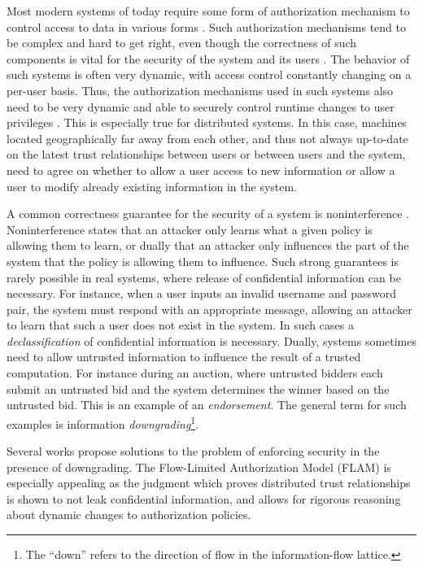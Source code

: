 Most modern systems of today require some form of authorization mechanism to control access to data in various forms \cite{Menezes:1996:HAC:548089}. Such authorization mechanisms tend to be complex and hard to get right, even though the correctness of such components is vital for the security of the system and its users \cite{Ferraiolo:1999:RAC:300830.300834}. The behavior of such systems is often very dynamic, with access control constantly changing on a per-user basis. Thus, the authorization mechanisms used in such systems also need to be very dynamic and able to securely control runtime changes to user privileges \cite{Ferraiolo:1999:RAC:300830.300834}.
This is especially true for distributed systems. In this case, machines located geographically far away from each other, and thus not always up-to-date on the latest trust relationships between users or between users and the system, need to agree on whether to allow a user access to new information or allow a user to modify already existing information in the system.

A common correctness guarantee for the security of a system is noninterference \cite{6234468}. Noninterference states that an attacker only learns what a given policy is allowing them to learn, or dually that an attacker only influences the part of the system that the policy is allowing them to influence. Such strong guarantees is rarely possible in real systems, where release of confidential information can be necessary. For instance, when a user inputs an invalid username and password pair, the system must respond with an appropriate message, allowing an attacker to learn that such a user does not exist in the system. In such cases a \emph{declassification} of confidential information is necessary. Dually, systems sometimes need to allow untrusted information to influence the result of a trusted computation. For instance during an auction, where untrusted bidders each submit an untrusted bid and the system determines the winner based on the untrusted bid. This is an example of an \emph{endorsement}. The general term for such examples is information \emph{downgrading}\footnote{The ``down'' refers to the direction of flow in the information-flow lattice.}.

Several works \cite{Efstathopoulos:2005:LEP:1095810.1095813, Krohn:2007:IFC:1294261.1294293, Arden:2015:FA:2859845.2859998, Hicks05dynamicupdating} propose solutions to the problem of enforcing security in the presence of downgrading. The Flow-Limited Authorization Model (FLAM) \cite{Arden:2015:FA:2859845.2859998} is especially appealing as the judgment which proves distributed trust relationships is shown to not leak confidential information, and allows for rigorous reasoning about dynamic changes to authorization policies.

